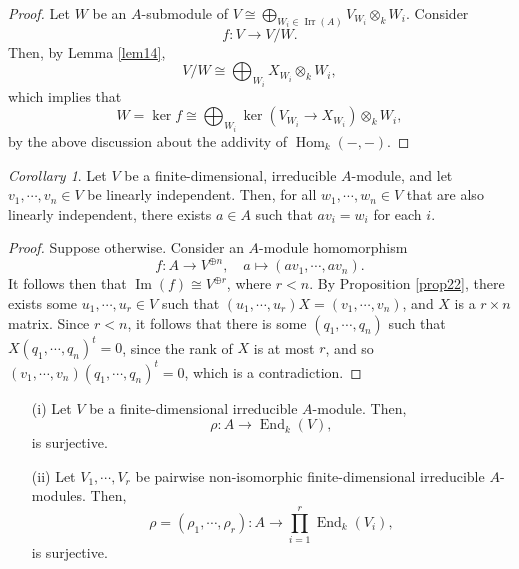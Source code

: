 \documentclass[a4paper]{report}
\theoremstyle{definition}
\theoremstyle{remark}
\theoremstyle{proposition}
\theoremstyle{conjecture}
\theoremstyle{lemma}
\theoremstyle{corollary}
\newtheorem{corollary}{Corollary}
\theoremstyle{exercise}
\theoremstyle{example}
\newcommand{\on}{\operatorname}
\begin{document}
\begin{proof}
    Let $W$ be an $A$-submodule of $V \cong \bigoplus_{W_i\in \on{Irr}(A)}V_{W_i}\otimes_k W_i$. Consider 
    $$f : V \longrightarrow V/W.$$
    Then, by Lemma \ref{lem14}, 
    $$V/W \cong \bigoplus_{W_i} X_{W_i}\otimes_k W_i,$$
    which implies that $$W = \ker f \cong \bigoplus_{W_i} \ker(V_{W_i}\to X_{W_i}) \otimes_k W_i,$$
    by the above discussion about the addivity of $\on{Hom}_k(-,-)$.
\end{proof}

\begin{corollary}\label{cor21}
    Let $V$ be a finite-dimensional, irreducible $A$-module, and let 
    $v_1,\cdots,v_n \in V$ be linearly independent. Then, for all
    $w_1,\cdots,w_n \in V$ that are also linearly independent, there exists 
    $a\in A$ such that $av_i = w_i$ for each $i$.
\end{corollary}

\begin{proof}
    Suppose otherwise. Consider an $A$-module homomorphism 
    $$f : A \longrightarrow V^{\oplus n}, \quad a\longmapsto (av_1,\cdots,av_n).$$
    It follows then that $\on{Im}(f) \cong V^{\oplus r}$, where
    $r < n$. By Proposition \ref{prop22}, there exists some 
    $u_1,\cdots,u_r \in V$ such that 
    $(u_1,\cdots,u_r) X = (v_1,\cdots,v_n)$, and 
    $X$ is a $r\times n$ matrix. Since $r < n$, it follows that 
    there is some $(q_1,\cdots,q_n)$ such that 
    $X(q_1,\cdots,q_n)^t = 0$, since the rank of $X$ is at most $r$, and so 
    $(v_1,\cdots,v_n) (q_1,\cdots,q_n)^t = 0$, which is a contradiction.
\end{proof}

\begin{theorem}
    \leavevmode
    \begin{itemize}
        \item[(i)] Let $V$ be a finite-dimensional irreducible $A$-module.
            Then, $$\rho : A \longrightarrow \on{End}_k(V),$$
            is surjective.
        \item[(ii)] Let $V_1,\cdots, V_r$ be pairwise non-isomorphic
            finite-dimensional irreducible $A$-modules. Then,
            $$\rho = (\rho_1,\cdots,\rho_r) : A \longrightarrow \prod_{i=1}^r \on{End}_k(V_i),$$
            is surjective.
    \end{itemize}
\end{theorem}
\end{document}
